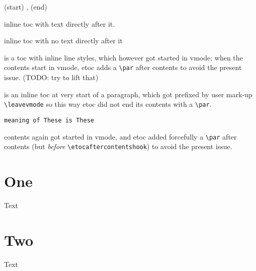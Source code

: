 \documentclass{article}
\begin{document}
  {(start) }
  {\etocname, }
  {}
  {(end) }%

\tableofcontents

\etocinline
\etocsettocstyle{}{}

\bigskip
inline toc \tableofcontents with text directly after it.

\bigskip

inline toc with no text directly after it \tableofcontents

\bigskip

\tableofcontents is a toc with inline line styles, which however got started
in vmode; when the contents start in vmode, etoc adds a \verb|\par| after
contents to avoid the present issue. (TODO: try to lift that)

\bigskip

\leavevmode
\tableofcontents is an inline toc at very start of a paragraph, which got
prefixed by user mark-up \verb|\leavevmode| so this way etoc did not end its
contents with a \verb|\par|.


\bigskip


\def\etocaftercontentshook{These }

\texttt{meaning of \string\etocaftercontentshook is \meaning\etocaftercontentshook}

\tableofcontents contents again got started in vmode, and etoc added
forcefully a \verb|\par| after contents (but \emph{before}
\verb|\etocaftercontentshook|) to avoid the present issue.

\bigskip

\section{One}

Text

\section{Two}

Text
\end{document}
